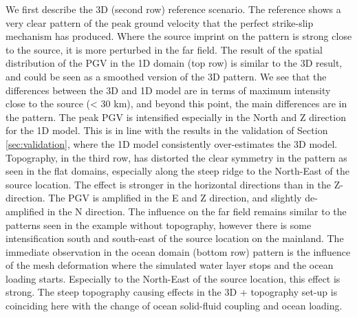 \documentclass[../Text/00main.tex]{subfiles}
\begin{document}
We first describe the 3D (second row) reference scenario. The reference shows a very clear pattern of the peak ground velocity that the perfect strike-slip mechanism has produced. Where the source imprint on the pattern is strong close to the source, it is more perturbed in the far field. The result of the spatial distribution of the PGV in the 1D domain (top row) is similar to the 3D result, and could be seen as a smoothed version of the 3D pattern. We see that the differences between the 3D and 1D model are in terms of maximum intensity close to the source (< 30 km), and beyond this point, the main differences are in the pattern. The peak PGV is intensified especially in the North and Z direction for the 1D model. This is in line with the results in the validation of Section \ref{sec:validation}, where the 1D model consistently over-estimates the 3D model. Topography, in the third row, has distorted the clear symmetry in the pattern as seen in the flat domains, especially along the steep ridge to the North-East of the source location. The effect is stronger in the horizontal directions than in the Z-direction. The PGV is amplified in the E and Z direction, and slightly de-amplified in the N direction. The influence on the far field remains similar to the patterns seen in the example without topography, however there is some intensification south and south-east of the source location on the mainland. The immediate observation in the ocean domain (bottom row) pattern is the influence of the mesh deformation where the simulated water layer stops and the ocean loading starts. Especially to the North-East of the source location, this effect is strong. The steep topography causing effects in the 3D + topography set-up is coinciding here with the change of ocean solid-fluid coupling and ocean loading.
\end{document}
